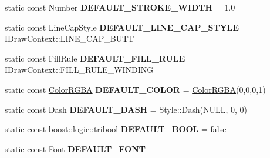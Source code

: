 \begin{DoxyCompactItemize}
\item 
\hypertarget{classsambag_1_1disco_1_1graphic_elements_1_1_style_a8ea45eadc4a8d55dd0d9e5fa614eb44c}{
static const Number {\bfseries DEFAULT\_\-STROKE\_\-WIDTH} = 1.0}
\label{classsambag_1_1disco_1_1graphic_elements_1_1_style_a8ea45eadc4a8d55dd0d9e5fa614eb44c}

\item 
\hypertarget{classsambag_1_1disco_1_1graphic_elements_1_1_style_a8cf9cfff7f010396fddae57ff1468e7a}{
static const LineCapStyle {\bfseries DEFAULT\_\-LINE\_\-CAP\_\-STYLE} = IDrawContext::LINE\_\-CAP\_\-BUTT}
\label{classsambag_1_1disco_1_1graphic_elements_1_1_style_a8cf9cfff7f010396fddae57ff1468e7a}

\item 
\hypertarget{classsambag_1_1disco_1_1graphic_elements_1_1_style_a25292f5a024b64fc0b3746516984f5c0}{
static const FillRule {\bfseries DEFAULT\_\-FILL\_\-RULE} = IDrawContext::FILL\_\-RULE\_\-WINDING}
\label{classsambag_1_1disco_1_1graphic_elements_1_1_style_a25292f5a024b64fc0b3746516984f5c0}

\item 
\hypertarget{classsambag_1_1disco_1_1graphic_elements_1_1_style_a56d6ed87bb40d65515dbe623ad1190d4}{
static const \hyperlink{structsambag_1_1com_1_1_color_r_g_b_a}{ColorRGBA} {\bfseries DEFAULT\_\-COLOR} = \hyperlink{structsambag_1_1com_1_1_color_r_g_b_a}{ColorRGBA}(0,0,0,1)}
\label{classsambag_1_1disco_1_1graphic_elements_1_1_style_a56d6ed87bb40d65515dbe623ad1190d4}

\item 
\hypertarget{classsambag_1_1disco_1_1graphic_elements_1_1_style_afe6fee56ac1e422a3a2583689c48512e}{
static const Dash {\bfseries DEFAULT\_\-DASH} = Style::Dash(NULL, 0, 0)}
\label{classsambag_1_1disco_1_1graphic_elements_1_1_style_afe6fee56ac1e422a3a2583689c48512e}

\item 
\hypertarget{classsambag_1_1disco_1_1graphic_elements_1_1_style_a4eb77015cbcc562d957a8929d3d2247c}{
static const boost::logic::tribool {\bfseries DEFAULT\_\-BOOL} = false}
\label{classsambag_1_1disco_1_1graphic_elements_1_1_style_a4eb77015cbcc562d957a8929d3d2247c}

\item 
\hypertarget{classsambag_1_1disco_1_1graphic_elements_1_1_style_a3e9930e86d05a6794164019d6b463bde}{
static const \hyperlink{structsambag_1_1disco_1_1_font}{Font} {\bfseries DEFAULT\_\-FONT}}
\label{classsambag_1_1disco_1_1graphic_elements_1_1_style_a3e9930e86d05a6794164019d6b463bde}

\end{DoxyCompactItemize}


